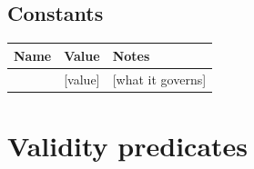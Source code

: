 \documentclass[11pt]{article}
\begin{document}
\subsection{Constants}
%
%
%
\begin{center}
\begin{tabular}{@{}lll@{}}
\toprule
Name & Value & Notes \\
\midrule
[CONST\_A] & [value] & [what it governs] \\ %
\bottomrule
\end{tabular}
\end{center}

\section{Validity predicates}
\end{document}
